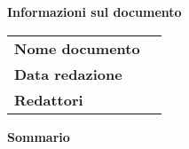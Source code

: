 % 
%
% 
%


\begin{center}

	\textbf{\Large Informazioni sul documento}
	\vspace{0.5 cm}

	\begin{longtable}{ l | p{6 cm} } %
		\textbf{Nome documento} &  {\documentName}\\[0.5 cm]
		\textbf{Data redazione} & {\redactionDate} \\[0.5 cm]
		\textbf{Redattori} & \parbox{\textwidth}{\documentAuthor} \\[0.5 cm]
	\end{longtable}

	\vspace{2 cm}

	\textbf{\Large Sommario} \\
	\documentScope

\end{center}

\pagebreak